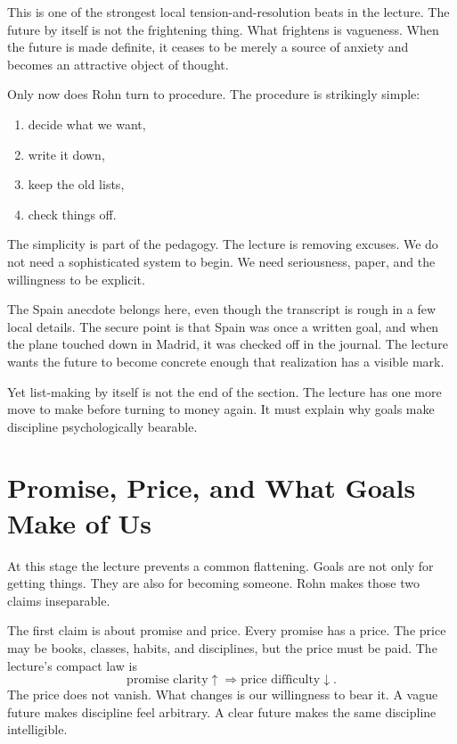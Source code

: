 This is one of the strongest local tension-and-resolution beats in the lecture. The future by itself is not the frightening thing. What frightens is vagueness. When the future is made definite, it ceases to be merely a source of anxiety and becomes an attractive object of thought.

Only now does Rohn turn to procedure. The procedure is strikingly simple:
\begin{enumerate}
\item decide what we want,
\item write it down,
\item keep the old lists,
\item check things off.
\end{enumerate}
The simplicity is part of the pedagogy. The lecture is removing excuses. We do not need a sophisticated system to begin. We need seriousness, paper, and the willingness to be explicit.

The Spain anecdote belongs here, even though the transcript is rough in a few local details. The secure point is that Spain was once a written goal, and when the plane touched down in Madrid, it was checked off in the journal. The lecture wants the future to become concrete enough that realization has a visible mark.

Yet list-making by itself is not the end of the section. The lecture has one more move to make before turning to money again. It must explain why goals make discipline psychologically bearable.

\section{Promise, Price, and What Goals Make of Us}

At this stage the lecture prevents a common flattening. Goals are not only for getting things. They are also for becoming someone. Rohn makes those two claims inseparable.

The first claim is about promise and price. Every promise has a price. The price may be books, classes, habits, and disciplines, but the price must be paid. The lecture's compact law is
\begin{equation}
\text{promise clarity}\uparrow \Rightarrow \text{price difficulty}\downarrow.
\end{equation}
The price does not vanish. What changes is our willingness to bear it. A vague future makes discipline feel arbitrary. A clear future makes the same discipline intelligible.

